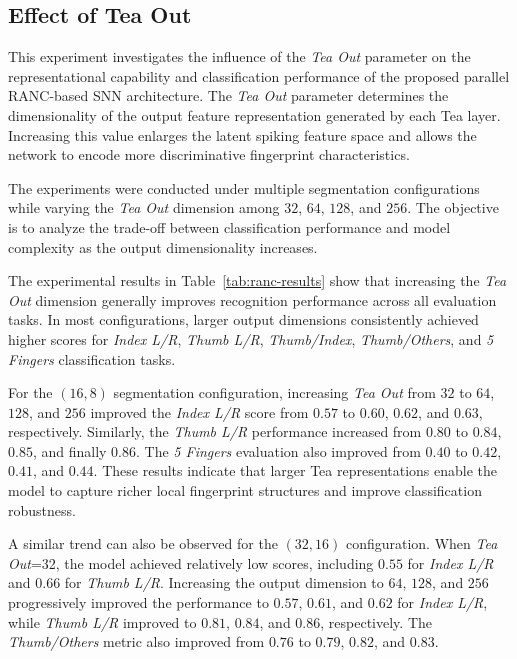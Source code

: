 \documentclass[../main.tex]{subfiles}
\begin{document}
\subsection{Effect of Tea Out}
This experiment investigates the influence of the \textit{Tea Out} parameter on the representational capability and classification performance of the proposed parallel RANC-based SNN architecture. The \textit{Tea Out} parameter determines the dimensionality of the output feature representation generated by each Tea layer. Increasing this value enlarges the latent spiking feature space and allows the network to encode more discriminative fingerprint characteristics.

The experiments were conducted under multiple segmentation configurations while varying the \textit{Tea Out} dimension among \(32\), \(64\), \(128\), and \(256\). The objective is to analyze the trade-off between classification performance and model complexity as the output dimensionality increases.

The experimental results in Table~\ref{tab:ranc-results} show that increasing the \textit{Tea Out} dimension generally improves recognition performance across all evaluation tasks. In most configurations, larger output dimensions consistently achieved higher scores for \textit{Index L/R}, \textit{Thumb L/R}, \textit{Thumb/Index}, \textit{Thumb/Others}, and \textit{5 Fingers} classification tasks.

For the \((16,8)\) segmentation configuration, increasing \textit{Tea Out} from \(32\) to \(64\), \(128\), and \(256\) improved the \textit{Index L/R} score from \(0.57\) to \(0.60\), \(0.62\), and \(0.63\), respectively. Similarly, the \textit{Thumb L/R} performance increased from \(0.80\) to \(0.84\), \(0.85\), and finally \(0.86\). The \textit{5 Fingers} evaluation also improved from \(0.40\) to \(0.42\), \(0.41\), and \(0.44\). These results indicate that larger Tea representations enable the model to capture richer local fingerprint structures and improve classification robustness.

A similar trend can also be observed for the \((32,16)\) configuration. When \textit{Tea Out}=32, the model achieved relatively low scores, including \(0.55\) for \textit{Index L/R} and \(0.66\) for \textit{Thumb L/R}. Increasing the output dimension to \(64\), \(128\), and \(256\) progressively improved the performance to \(0.57\), \(0.61\), and \(0.62\) for \textit{Index L/R}, while \textit{Thumb L/R} improved to \(0.81\), \(0.84\), and \(0.86\), respectively. The \textit{Thumb/Others} metric also improved from \(0.76\) to \(0.79\), \(0.82\), and \(0.83\).
\end{document}
